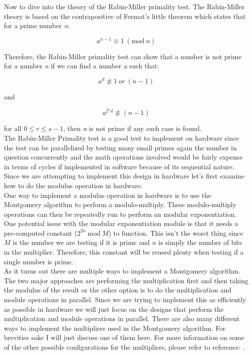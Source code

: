 \documentclass[journal]{IEEEtran}
\begin{document}
Now to dive into the theory of the Rabin-Miller primality test. The Rabin-Miller theory is based on the contrapositive of Fermat's little theorem which states that for a prime number \textit{n}:

	\begin{displaymath}
		a^{n-1} \equiv 1\ (\textrm{mod}\ n)
	\end{displaymath}

Therefore, the Rabin-Miller primality test can show that a number is not prime for a number \textit{n} if we can find a number \textit{a} such that:

	\begin{displaymath}
		a^d \not \equiv 1\ or\ (n-1)
	\end{displaymath}
	
and

	\begin{displaymath}
		a^{2^rd} \not \equiv (n-1)
	\end{displaymath}

for all $0 \le r \le s-1$, then \textit{n} is not prime if any such case is found. \cite{wiki_miller-rabin} \\

The Rabin-Miller Primality test is a good test to implement on hardware since the test can be parallelized by testing many small primes again the number in question concurrently and the math operations involved would be fairly expense in terms of cycles if implemented in software because of its sequential nature. Since we are attempting to implement this design in hardware let's first examine how to do the modulus operation in hardware. \\

One way to implement a modulus operation in hardware is to use the Montgomery algorithm to perform a modulo-multiply. These modulo-multiply operations can then be repeatedly run to perform an modular exponentiation. One potential issue with the modular exponentiation module is that it needs a pre-computed constant ($2^{2n}\ \textrm{mod}\ M$) to function. This isn't the worst thing since $M$ is the number we are testing if it is prime and $n$ is simply the number of bits in the multiplier. Therefore, this constant will be reused plenty when testing if a single number is prime. \\

As it turns out there are multiple ways to implement a Montgomery algorithm. The two major approaches are performing the multiplication first and then taking the modulus of the result or the other option is to do the multiplication and module operations in parallel. Since we are trying to implement this as efficiently as possible in hardware we will just focus on the designs that perform the multiplication and module operations in parallel. There are also many different ways to implement the multipliers used in the Montgomery algorithm. For brevities sake I will just discuss one of them here. For more information on some of the other possible configurations for the multipliers, please refer to reference: \cite{daly}. \\
\end{document}
